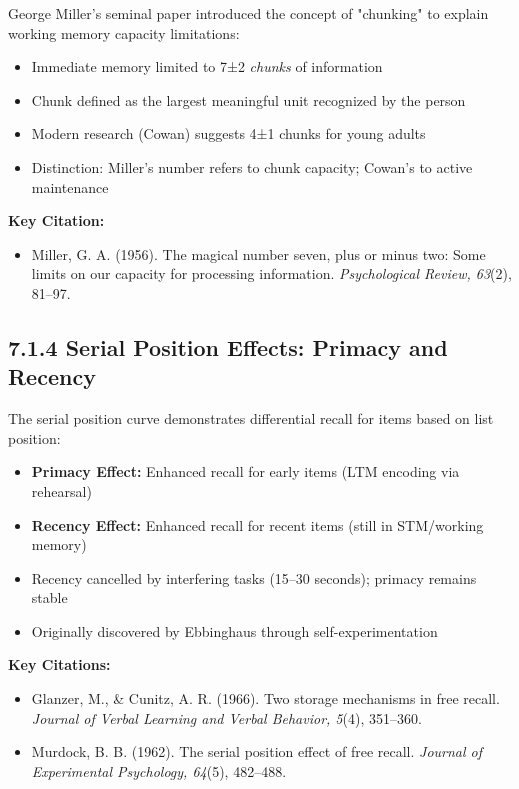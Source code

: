 \documentclass[11pt,letterpaper]{article}
\begin{document}
George Miller's seminal paper introduced the concept of "chunking" to explain working memory capacity limitations:

\begin{itemize}[leftmargin=*]
    \item Immediate memory limited to 7±2 \textit{chunks} of information
    \item Chunk defined as the largest meaningful unit recognized by the person
    \item Modern research (Cowan) suggests 4±1 chunks for young adults
    \item Distinction: Miller's number refers to chunk capacity; Cowan's to active maintenance
\end{itemize}

\textbf{Key Citation:}
\begin{itemize}[leftmargin=*]
    \item Miller, G. A. (1956). The magical number seven, plus or minus two: Some limits on our capacity for processing information. \textit{Psychological Review, 63}(2), 81--97.
\end{itemize}

\subsection{7.1.4 Serial Position Effects: Primacy and Recency}

The serial position curve demonstrates differential recall for items based on list position:

\begin{itemize}[leftmargin=*]
    \item \textbf{Primacy Effect:} Enhanced recall for early items (LTM encoding via rehearsal)
    \item \textbf{Recency Effect:} Enhanced recall for recent items (still in STM/working memory)
    \item Recency cancelled by interfering tasks (15--30 seconds); primacy remains stable
    \item Originally discovered by Ebbinghaus through self-experimentation
\end{itemize}

\textbf{Key Citations:}
\begin{itemize}[leftmargin=*]
    \item Glanzer, M., \& Cunitz, A. R. (1966). Two storage mechanisms in free recall. \textit{Journal of Verbal Learning and Verbal Behavior, 5}(4), 351--360.
    \item Murdock, B. B. (1962). The serial position effect of free recall. \textit{Journal of Experimental Psychology, 64}(5), 482--488.
\end{itemize}
\end{document}
